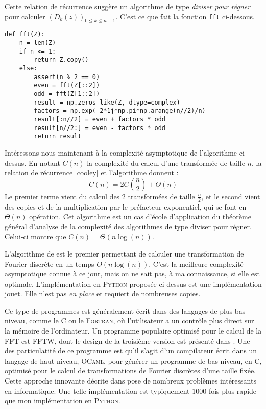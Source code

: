 \documentclass{article}
\begin{document}
Cette relation de récurrence suggère un algorithme de type \emph{diviser pour régner} pour calculer $(D_k(z))_{0\le k \le n-1}$. C'est ce que fait la fonction \texttt{fft} ci-dessous.

\begin{verbatim}
def fft(Z):
    n = len(Z)
    if n <= 1:
        return Z.copy()
    else:
        assert(n % 2 == 0)
        even = fft(Z[::2])
        odd = fft(Z[1::2])
        result = np.zeros_like(Z, dtype=complex)
        factors = np.exp(-2*1j*np.pi*np.arange(n//2)/n)
        result[:n//2] = even + factors * odd
        result[n//2:] = even - factors * odd
        return result
\end{verbatim}

Intéressons nous maintenant à la complexité asymptotique de l'algorithme ci-dessus. En notant $C(n)$ la complexité du calcul d'une transformée de taille $n$, la relation de récurrence \eqref{cooley} et l'algorithme donnent : 
\begin{equation}
  C(n) = 2C\left(\frac{n}{2}\right) + \Theta(n)
  \label{eq:}
\end{equation}
Le premier terme vient du calcul des $2$ transformées de taille $\frac{n}{2}$, et le second vient des copies et de la multiplication par le préfacteur exponentiel, qui se font en $\Theta(n)$ opération. Cet algorithme est un cas d'école d'application du théorème général d'analyse de la complexité des algorithmes de type diviser pour régner. Celui-ci montre que $C(n) = \Theta(n\log(n))$.

L'algorithme de \cite{FFT} est le premier permettant de calculer une transformation de Fourier discrète en un temps $O(n\log(n))$. 
C'est la meilleure complexité asymptotique connue à ce jour, mais on ne sait pas, à ma connaissance, si elle est optimale. 
L'implémentation en \textsc{Python} proposée ci-dessus est une implémentation jouet. 
Elle n'est pas \emph{en place} et requiert de nombreuses copies. 

Ce type de programmes est généralement écrit dans des langages de plus bas niveau, comme le \textsc{C} ou le \textsc{Fortran}, où l'utilisateur a un contrôle plus direct sur la mémoire de l'ordinateur. 
Un programme populaire optimisé pour le calcul de la FFT est \textsc{FFTW}, dont le design de la troisième version est présenté dans \cite{FFTW05}. 
Une des particulatité de ce programme est qu'il s'agit d'un compilateur écrit dans un langage de haut niveau, \textsc{OCaml}, pour générer un programme de bas niveau, en \textsc{C}, optimisé pour le calcul de transformations de Fourier discrètes d'une taille fixée. 
Cette approche innovante décrite dans \cite{FFTW99} pose de nombreux problèmes intéressants en informatique. Une telle implémentation est typiquement $1000$ fois plus rapide que mon implémentation en \textsc{Python}.
\end{document}
